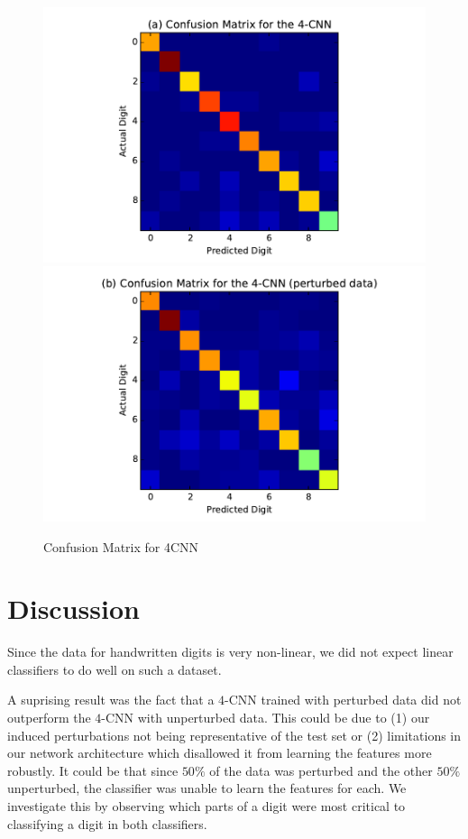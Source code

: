 \documentclass[conference]{IEEEtran}
\begin{document}
\begin{figure}[h]
	\label{4CNN_confusion}
	\centering
	\includegraphics[scale=0.5]{4CNN_confusion.pdf}
	\includegraphics[scale=0.5]{4CNN_perturbed_confusion.pdf}
	\caption{Confusion Matrix for 4CNN}
\end{figure}
\section{Discussion}

Since the data for handwritten digits is very non-linear, we did not expect linear classifiers to do well on such a dataset.

A suprising result was the fact that a $4$-CNN trained with perturbed data did not outperform the $4$-CNN with unperturbed data. This could be due to (1) our induced perturbations not being representative of the test set or (2) limitations in our network architecture which disallowed it from learning the features more robustly. It could be that since $50\%$ of the data was perturbed and the other $50\%$ unperturbed, the classifier was unable to learn the features for each. We investigate this by observing which parts of a digit were most critical to classifying a digit in both classifiers.
\end{document}
